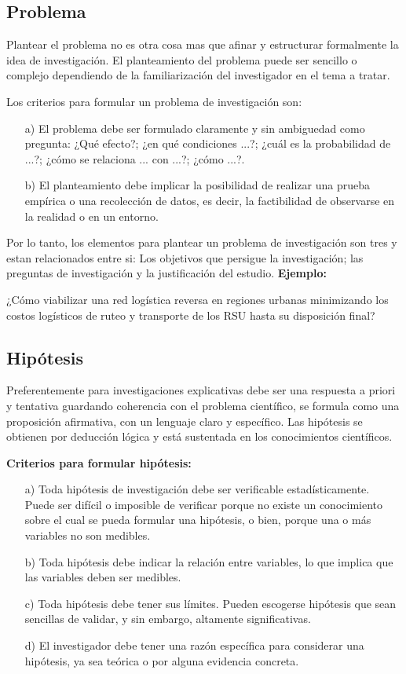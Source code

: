 \documentclass[a4paper, 12pt]{article}
\begin{document}
\subsection{Problema}
Plantear el problema no es otra cosa mas que afinar y estructurar formalmente la idea de investigación. El planteamiento del problema puede ser sencillo o complejo dependiendo de la familiarización del investigador en el tema a tratar.\par    
\vskip 0.3cm
Los criterios para formular un problema de investigación son:
\begin{enumerate}
\item[a)] El problema debe ser formulado claramente y sin ambiguedad como pregunta: ¿Qué efecto?; ¿en qué condiciones ...?; ¿cuál es la probabilidad de ...?; ¿cómo se relaciona ... con ...?; ¿cómo ...?.
\vskip 0.3cm
\item[b)] El planteamiento debe implicar la posibilidad de realizar una prueba empírica o una recolección de datos, es decir, la factibilidad de observarse en la realidad o en un entorno. 
\end{enumerate}
Por lo tanto, los elementos para plantear un problema de investigación son tres y estan relacionados entre si: Los objetivos que persigue la investigación; las preguntas de investigación y la justificación del estudio. \cite{Erica}
\vskip 0.3cm
{\bf Ejemplo:}\par  
¿Cómo viabilizar una red logística reversa en regiones urbanas minimizando los costos logísticos de ruteo y transporte de los RSU hasta su disposición final?


\subsection{Hipótesis}
Preferentemente para investigaciones explicativas debe ser una respuesta a priori y tentativa guardando coherencia con el problema científico, se formula como una proposición afirmativa, con un lenguaje claro y específico.  Las hipótesis se obtienen por deducción lógica y está sustentada en los conocimientos científicos. \par  
\vskip 0.3cm
{\bf Criterios para formular hipótesis:} \cite{Erica}
\begin{enumerate}
\item[a)] Toda hipótesis de investigación debe ser verificable estadísticamente.  Puede ser difícil o imposible de verificar porque no existe un conocimiento sobre el cual se pueda formular una hipótesis, o bien, porque una o más variables no son medibles.
\vskip 0.2cm
\item[b)] Toda hipótesis debe indicar la relación entre variables, lo que implica que las variables deben ser medibles.
\vskip 0.2cm
\item[c)] Toda hipótesis debe tener sus límites. Pueden escogerse hipótesis que sean sencillas de validar, y sin embargo, altamente significativas.
\vskip 0.2cm
\item[d)] El investigador debe tener una razón específica para considerar una hipótesis, ya sea teórica o por alguna evidencia concreta.    
\end{enumerate}
\end{document}
